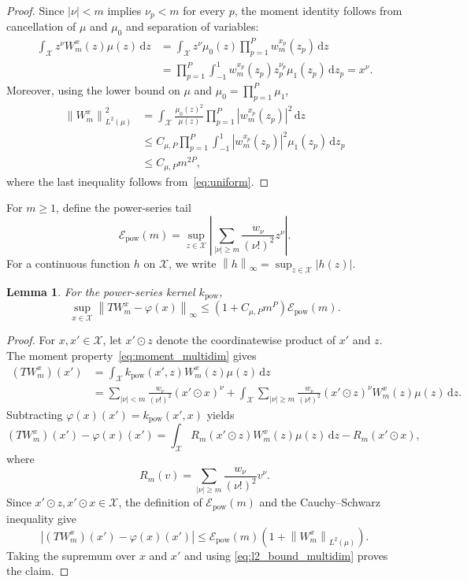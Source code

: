 \documentclass[11pt]{article}
\numberwithin{equation}{section}
\theoremstyle{plain}
\newtheorem{lemma}[theorem]{Lemma}
\theoremstyle{definition}
\theoremstyle{remark}
\newcommand{\X}{\mathcal{X}}
\newcommand{\norm}[1]{\left\lVert#1\right\rVert}
\begin{document}
\begin{proof}
Since $|\nu|<m$ implies $\nu_p<m$ for every $p$, the moment identity follows
from cancellation of $\mu$ and $\mu_0$ and separation of variables:
\[
\begin{aligned}
\int_{\X}z^\nu W_m^x(z)\mu(z)\,\mathrm{d}z
&=
\int_{\X}
z^\nu\mu_0(z)
\prod_{p=1}^P w_m^{x_p}(z_p)\,\mathrm{d}z\\
&=
\prod_{p=1}^P
\int_{-1}^1
w_m^{x_p}(z_p)z_p^{\nu_p}\mu_1(z_p)\,\mathrm{d}z_p
=
x^\nu.
\end{aligned}
\]
Moreover, using the lower bound on $\mu$ and
$\mu_0=\prod_{p=1}^P\mu_1$,
\[
\begin{aligned}
\norm{W_m^x}_{L^2(\mu)}^2
&=
\int_{\X}
\frac{\mu_0(z)^2}{\mu(z)}
\prod_{p=1}^P
\left|w_m^{x_p}(z_p)\right|^2\,\mathrm{d}z\\
&\leq
C_{\mu,P}
\prod_{p=1}^P
\int_{-1}^1
\left|w_m^{x_p}(z_p)\right|^2\mu_1(z_p)\,\mathrm{d}z_p\\
&\leq
C_{\mu,P}m^{2P},
\end{aligned}
\]
where the last inequality follows from~\eqref{eq:uniform}.
\end{proof}

For $m\geq1$, define the power-series tail
\begin{equation}
\mathcal{E}_{\mathrm{pow}}(m)
=
\sup_{z\in\X}
\left|
\sum_{|\nu|\geq m}
\frac{w_\nu}{(\nu!)^2}z^\nu
\right|.
\label{eq:tail_pow}
\end{equation}
For a continuous function $h$ on $\X$, we write
$\norm{h}_{\infty}=\sup_{z\in\X}|h(z)|$.

\begin{lemma}
\label{lem:approx_uniform}
For the power-series kernel $k_{\mathrm{pow}}$,
\begin{equation}
\sup_{x\in\X}
\norm{TW_m^x-\varphi(x)}_{\infty}
\leq
\left(1+C_{\mu,P}m^P\right)
\mathcal{E}_{\mathrm{pow}}(m).
\label{eq:approx_uniform}
\end{equation}
\end{lemma}

\begin{proof}
For $x,x'\in\X$, let $x'\odot z$ denote the coordinatewise product of
$x'$ and $z$. The moment property~\eqref{eq:moment_multidim} gives
\[
\begin{aligned}
(TW_m^x)(x')
&=
\int_{\X}k_{\mathrm{pow}}(x',z)W_m^x(z)\mu(z)\,\mathrm{d}z\\
&=
\sum_{|\nu|<m}
\frac{w_\nu}{(\nu!)^2}(x'\odot x)^\nu
+
\int_{\X}
\sum_{|\nu|\geq m}
\frac{w_\nu}{(\nu!)^2}(x'\odot z)^\nu
W_m^x(z)\mu(z)\,\mathrm{d}z.
\end{aligned}
\]
Subtracting
$\varphi(x)(x')=k_{\mathrm{pow}}(x',x)$ yields
\[
(TW_m^x)(x')-\varphi(x)(x')
=
\int_{\X}R_m(x'\odot z)W_m^x(z)\mu(z)\,\mathrm{d}z
-
R_m(x'\odot x),
\]
where
\[
R_m(v)
=
\sum_{|\nu|\geq m}
\frac{w_\nu}{(\nu!)^2}v^\nu.
\]
Since $x'\odot z,x'\odot x\in\X$, the definition of
$\mathcal{E}_{\mathrm{pow}}(m)$ and the Cauchy--Schwarz inequality give
\[
\left|(TW_m^x)(x')-\varphi(x)(x')\right|
\leq
\mathcal{E}_{\mathrm{pow}}(m)
\left(
1+\norm{W_m^x}_{L^2(\mu)}
\right).
\]
Taking the supremum over $x$ and $x'$ and using
\eqref{eq:l2_bound_multidim} proves the claim.
\end{proof}
\end{document}
